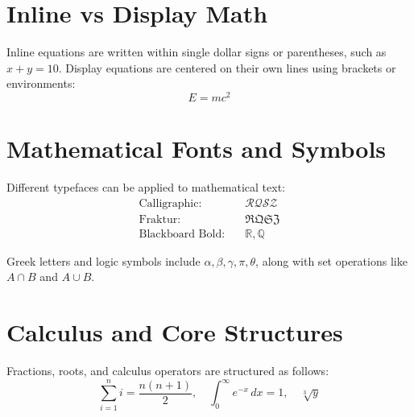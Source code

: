 \documentclass[12pt]{article}
\begin{document}
\section*{Inline vs Display Math}
Inline equations are written within single dollar signs or parentheses, such as $x + y = 10$. 
Display equations are centered on their own lines using brackets or environments:
\[
E = mc^2
\]

\section*{Mathematical Fonts and Symbols}
Different typefaces can be applied to mathematical text:
\begin{align*}
\text{Calligraphic:} & \quad \mathcal{RQSZ} \\
\text{Fraktur:} & \quad \mathfrak{RQSZ} \\
\text{Blackboard Bold:} & \quad \mathbb{R}, \mathbb{Q}
\end{align*}

Greek letters and logic symbols include $\alpha, \beta, \gamma, \pi, \theta$, along with set operations like $A \cap B$ and $A \cup B$.

\section*{Calculus and Core Structures}
Fractions, roots, and calculus operators are structured as follows:
\[
\sum_{i=1}^{n} i = \frac{n(n+1)}{2}, \quad \int_0^\infty e^{-x} \, dx = 1, \quad \sqrt[3]{y}
\]
\end{document}
